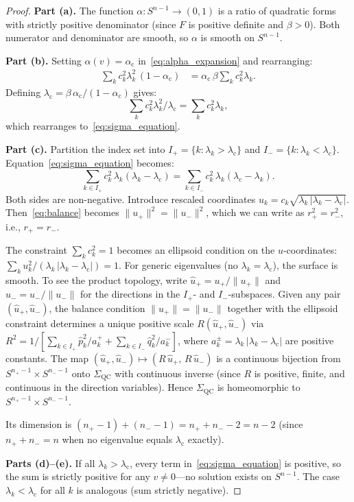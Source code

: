 \documentclass[11pt,a4paper]{article}
\theoremstyle{plain}
\theoremstyle{definition}
\newcommand{\Sn}{S^{n-1}}
\newcommand{\SigmaQC}{\Sigma_{\mathrm{QC}}}
\newcommand{\alphac}{\alpha_{\mathrm{c}}}
\newcommand{\lamc}{\lambda_{\mathrm{c}}}
\begin{document}
\begin{proof}
\textbf{Part (a).}
The function $\alpha \colon \Sn \to (0,1)$ is a ratio of
quadratic forms with strictly positive denominator (since $F$ is
positive definite and $\beta > 0$).  Both numerator and denominator
are smooth, so $\alpha$ is smooth on $\Sn$.

\textbf{Part (b).}
Setting $\alpha(v) = \alphac$ in~\eqref{eq:alpha_expansion} and
rearranging:
\begin{align*}
\sum_k c_k^2 \lambda_k^2 \,(1 - \alphac)
  &= \alphac\,\beta \sum_k c_k^2 \lambda_k.
\end{align*}
Defining $\lamc = \beta\,\alphac/(1-\alphac)$ gives:
\[
\sum_k c_k^2 \lambda_k^2 / \lamc = \sum_k c_k^2 \lambda_k,
\]
which rearranges to~\eqref{eq:sigma_equation}.

\textbf{Part (c).}
Partition the index set into $I_+ = \{k : \lambda_k > \lamc\}$
and $I_- = \{k : \lambda_k < \lamc\}$.
Equation~\eqref{eq:sigma_equation} becomes:
\begin{equation}
\label{eq:balance}
\sum_{k \in I_+} c_k^2\,\lambda_k(\lambda_k - \lamc)
= \sum_{k \in I_-} c_k^2\,\lambda_k(\lamc - \lambda_k).
\end{equation}
Both sides are non-negative.  Introduce rescaled coordinates
$u_k = c_k \sqrt{\lambda_k\,|\lambda_k - \lamc|}$.
Then~\eqref{eq:balance} becomes $\|u_+\|^2 = \|u_-\|^2$,
which we can write as $r_+^2 = r_-^2$, i.e., $r_+ = r_-$.

The constraint $\sum_k c_k^2 = 1$ becomes an ellipsoid condition
on the $u$-coordinates: $\sum_k u_k^2 / (\lambda_k\,|\lambda_k - \lamc|)
= 1$.  For generic eigenvalues (no $\lambda_k = \lamc$), the
surface is smooth.  To see the product topology, write
$\hat{u}_+ = u_+/\|u_+\|$ and $\hat{u}_- = u_-/\|u_-\|$ for the
directions in the $I_+$- and $I_-$-subspaces.  Given any pair
$(\hat{u}_+, \hat{u}_-)$, the balance condition $\|u_+\| = \|u_-\|$
together with the ellipsoid constraint determines a unique positive
scale $R(\hat{u}_+, \hat{u}_-)$ via
$R^2 = 1/[\sum_{k \in I_+} \hat{p}_k^2/a_k^{+} +
\sum_{k \in I_-} \hat{q}_k^2/a_k^{-}]$,
where $a_k^{\pm} = \lambda_k\,|\lambda_k - \lamc|$ are positive
constants.  The map $(\hat{u}_+, \hat{u}_-) \mapsto
(R\,\hat{u}_+,\, R\,\hat{u}_-)$ is a continuous bijection from
$S^{n_+-1} \times S^{n_--1}$ onto $\SigmaQC$ with continuous
inverse (since $R$ is positive, finite, and continuous in the
direction variables).  Hence $\SigmaQC$ is homeomorphic to
$S^{n_+-1} \times S^{n_--1}$.

Its dimension is $(n_+-1) + (n_--1) = n_+ + n_- - 2 = n - 2$
(since $n_+ + n_- = n$ when no eigenvalue equals $\lamc$ exactly).

\textbf{Parts (d)--(e).}
If all $\lambda_k > \lamc$, every term in~\eqref{eq:sigma_equation}
is positive, so the sum is strictly positive for any
$v \neq 0$---no solution exists on $\Sn$.  The case
$\lambda_k < \lamc$ for all $k$ is analogous (sum strictly
negative).
\end{proof}
\end{document}
